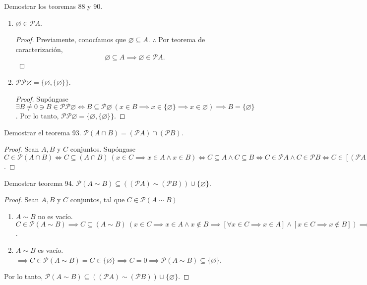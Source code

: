 
	\begin{problema}
	Demostrar los teoremas 88 y 90. 
	\begin{enumerate}
		\item[88.] $\varnothing\in \mathcal{P}A$.
		\begin{proof}
			Previamente, conocíamos que $\varnothing \subseteq A$. $\therefore$ Por teorema de caracterización, $$\varnothing \subseteq A \implies \varnothing\in \mathcal{P}A.$$		\end{proof}
		
		\item[90.] $\mathcal{P}\mathcal{P}\varnothing=\{\varnothing,\{\varnothing\}\}$.
		\begin{proof}
			Supóngase $\exists B\neq 0\ni B\in \mathcal{P}\mathcal{P}\varnothing\iff B\subseteq \mathcal{P}\varnothing \ (x\in B\implies x\in \{\varnothing\}\implies x\in \varnothing)\implies B=\{\varnothing\}$. Por lo tanto, $\mathcal{P}\mathcal{P}\varnothing=\{\varnothing,\{\varnothing\}\}$.
		\end{proof}
	\end{enumerate}
\end{problema}


	\begin{problema}
	Demostrar el teorema 93. $\mathcal{P}(A\cap B)=(\mathcal{P} A)\cap (\mathcal{P}B)$. 
\end{problema}
\begin{proof}
	Sean $A,B$ y $C$ conjuntos. Supóngase
	$C\in \mathcal{P}(A\cap B) \iff C\subseteq (A\cap B)\ (x\in C\implies x\in A\wedge x\in B) \iff C\subseteq  A \wedge C\subseteq  B \iff C\in   \mathcal{P}A \wedge C\in  \mathcal{P} B\iff  C\in [(\mathcal{P} A)\cap (\mathcal{P}B)]. \therefore \ \mathcal{P}(A\cap B)=(\mathcal{P} A)\cap (\mathcal{P}B)$.
\end{proof}

	\begin{problema}
	Demostrar teorema 94. $\mathcal{P}(A \sim B)\subseteq ((\mathcal{P}A)\sim(\mathcal{P}B) )\cup \{\varnothing\}$.
\end{problema}
\begin{proof}
	
	Sean $A,B$ y $C$ conjuntos, tal que $C\in \mathcal{P}(A\sim B)$ 
	\begin{enumerate}
		\item $A\sim B$ no es vacío. $C\in \mathcal{P}(A \sim B) \implies C\subseteq (A\sim B)\ (x\in C\implies x\in A \wedge x\not\in B\implies [\forall x\in C\implies x\in A]\wedge [x\in C\implies x\not\in B])\implies C\subseteq A \wedge C\not\subseteq B\implies C\in \mathcal{P}A \wedge C\not\in \mathcal{P}B\implies C\in [(\mathcal{P}A) \sim (\mathcal{P} B)]\implies \mathcal{P}(A \sim B)\subseteq ((\mathcal{P}A)\sim(\mathcal{P}B) )$.
		\item $A\sim B$ es vacío. $\implies C\in \mathcal{P}(A\sim B)= C\in \{\varnothing\}\implies C=0\implies \mathcal{P}(A\sim B)\subseteq \{\varnothing\}$.
	\end{enumerate}
	
	 Por lo tanto, $\mathcal{P}(A \sim B)\subseteq ((\mathcal{P}A)\sim(\mathcal{P}B) )\cup \{\varnothing\}$.
\end{proof}

